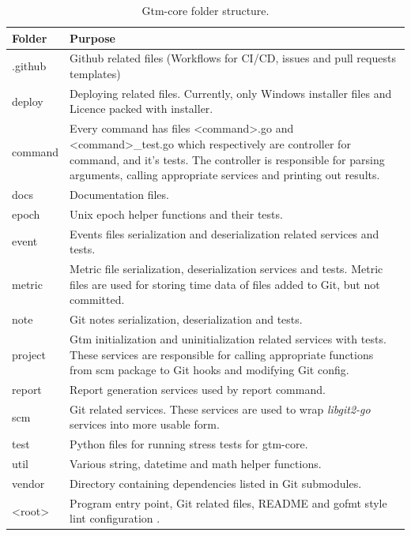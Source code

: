 \begin{table}[h]
    \centering
    \begin{tabular}{ | p{3cm} | p{10cm} |}
        \hline
        Folder & Purpose\\
        \hline
        .github & Github related files (Workflows for CI/CD, issues and pull requests templates)\\
        \hline
        deploy & Deploying related files.
        Currently, only Windows installer files and Licence packed with installer.\\
        \hline
        command & Every command has files <command>.go and <command>\_test.go which respectively are controller for command, and it's tests.
        The controller is responsible for parsing arguments, calling appropriate services and printing out results.\\
        \hline
        docs & Documentation files.\\
        \hline
        epoch & Unix epoch helper functions and their tests.\\
        \hline
        event & Events files serialization and deserialization related services and tests.\\
        \hline
        metric & Metric file serialization, deserialization services and tests.
        Metric files are used for storing time data of files added to Git, but not committed.\\
        \hline
        note & Git notes serialization, deserialization and tests.\\
        \hline
        project & Gtm initialization and uninitialization related services with tests.
        These services are responsible for calling appropriate functions from scm package to Git hooks and modifying Git config.\\
        \hline
        report & Report generation services used by report command.\\
        \hline
        scm & Git related services.
        These services are used to wrap \textit{libgit2-go} services into more usable form.\\
        \hline
        test & Python files for running stress tests for gtm-core.\\
        \hline
        util & Various string, datetime and math helper functions.\\
        \hline
        vendor & Directory containing dependencies listed in Git submodules.\\
        \hline
        <root> & Program entry point, Git related files, README and gofmt style lint configuration .\\
        \hline
    \end{tabular}
    \caption{Gtm-core folder structure.}
    \label{tab:gtm-core-folder-structure}
\end{table}

